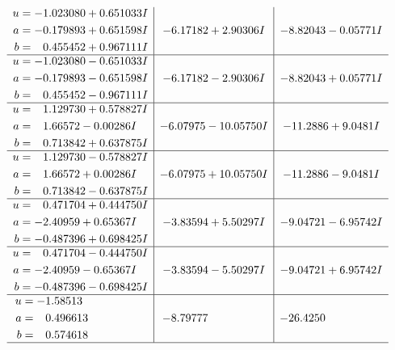 \documentclass[1p]{elsarticle_modified}
\theoremstyle{definition}
\begin{document}
$$\begin{array}{c|c|c}
\begin{aligned}
u &= -1.023080 + 0.651033 I \\
a &= -0.179893 + 0.651598 I \\
b &= \phantom{-}0.455452 + 0.967111 I\end{aligned}
 & -6.17182 + 2.90306 I & -8.82043 - 0.05771 I \\ \hline\begin{aligned}
u &= -1.023080 - 0.651033 I \\
a &= -0.179893 - 0.651598 I \\
b &= \phantom{-}0.455452 - 0.967111 I\end{aligned}
 & -6.17182 - 2.90306 I & -8.82043 + 0.05771 I \\ \hline\begin{aligned}
u &= \phantom{-}1.129730 + 0.578827 I \\
a &= \phantom{-}1.66572 - 0.00286 I \\
b &= \phantom{-}0.713842 + 0.637875 I\end{aligned}
 & -6.07975 - 10.05750 I & -11.2886 + 9.0481 I \\ \hline\begin{aligned}
u &= \phantom{-}1.129730 - 0.578827 I \\
a &= \phantom{-}1.66572 + 0.00286 I \\
b &= \phantom{-}0.713842 - 0.637875 I\end{aligned}
 & -6.07975 + 10.05750 I & -11.2886 - 9.0481 I \\ \hline\begin{aligned}
u &= \phantom{-}0.471704 + 0.444750 I \\
a &= -2.40959 + 0.65367 I \\
b &= -0.487396 + 0.698425 I\end{aligned}
 & -3.83594 + 5.50297 I & -9.04721 - 6.95742 I \\ \hline\begin{aligned}
u &= \phantom{-}0.471704 - 0.444750 I \\
a &= -2.40959 - 0.65367 I \\
b &= -0.487396 - 0.698425 I\end{aligned}
 & -3.83594 - 5.50297 I & -9.04721 + 6.95742 I \\ \hline\begin{aligned}
u &= -1.58513\phantom{ +0.000000I} \\
a &= \phantom{-}0.496613\phantom{ +0.000000I} \\
b &= \phantom{-}0.574618\phantom{ +0.000000I}\end{aligned}
 & -8.79777\phantom{ +0.000000I} & -26.4250\phantom{ +0.000000I}\\
 \hline 
 \end{array}$$\newpage\newpage\renewcommand{\arraystretch}{1}
\end{document}
